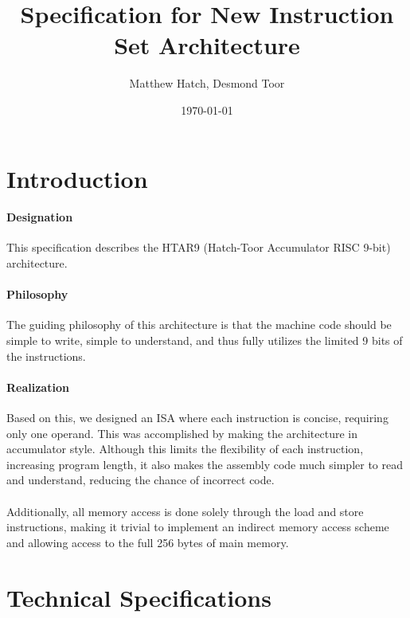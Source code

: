 \documentclass{article}
\title{Specification for New Instruction Set Architecture}
\date{\today}
\author{Matthew Hatch, Desmond Toor}
\begin{document}
    \maketitle
    \tableofcontents

    \newpage

    \section{Introduction}

    \paragraph{Designation}
    This specification describes the HTAR9 (Hatch-Toor Accumulator RISC 9-bit)
    architecture.

    \paragraph{Philosophy}
    The guiding philosophy of this architecture is that the machine code should
    be simple to write, simple to understand, and thus fully utilizes the
    limited 9 bits of the instructions.

    \paragraph{Realization}
    Based on this, we designed an ISA where each instruction is concise,
    requiring only one operand. This was accomplished by making the architecture
    in accumulator style. Although this limits the flexibility of each
    instruction, increasing program length, it also makes the assembly code much
    simpler to read and understand, reducing the chance of incorrect code.

    \paragraph{}
    Additionally, all memory access is done solely through the load and store
    instructions, making it trivial to implement an indirect memory access scheme
    and allowing access to the full 256 bytes of main memory.

    \section{Technical Specifications}
\end{document}
